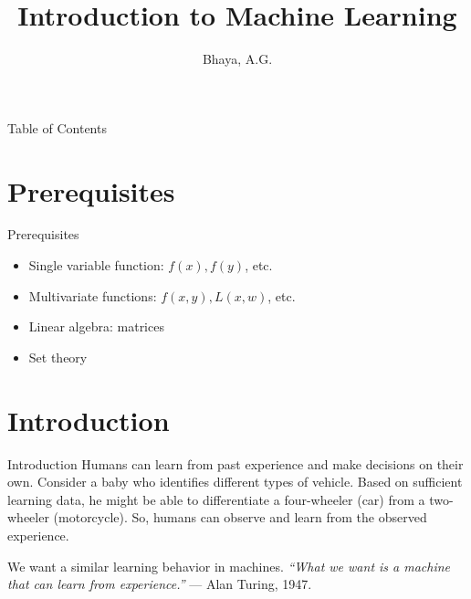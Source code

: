 \documentclass{beamer}
\title{Introduction to Machine Learning}
\author[Bhaya, A.G.]{Bhaya, A.G.}
\begin{document}
    \begin{frame}
        \titlepage
    \end{frame}

    \begin{frame}{Table of Contents}
        \tableofcontents
    \end{frame}

    \section{Prerequisites}
    \begin{frame}{Prerequisites}
        \begin{itemize}
            \item Single variable function: \(f(x), f(y)\), etc.
            \item Multivariate functions: \(f(x,y), L(x,w)\), etc.
            \item Linear algebra: matrices
            \item Set theory
        \end{itemize}
    \end{frame}

    \section{Introduction}
    \begin{frame}{Introduction}
        Humans can learn from past experience and make decisions on their own. Consider a baby who identifies different types of vehicle. Based on sufficient learning data, he might be able to differentiate a four-wheeler (car) from a two-wheeler (motorcycle). So, humans can observe and learn from the observed experience.

        We want a similar learning behavior in machines. \textit{``What we want is a machine that can learn from experience.''} --- Alan Turing, 1947.
    \end{frame}
\end{document}
